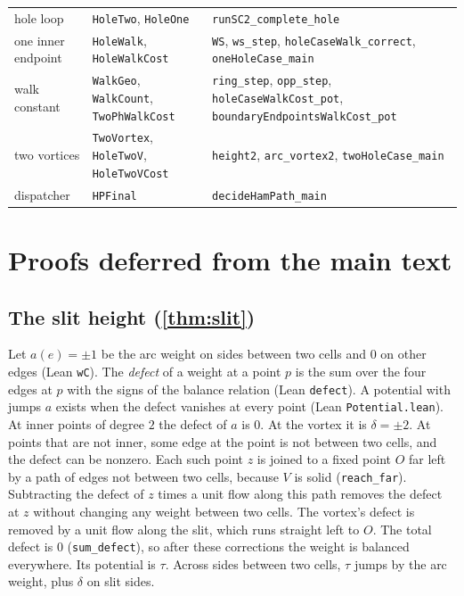 \documentclass[11pt]{article}
\theoremstyle{plain}
\theoremstyle{definition}
\theoremstyle{remark}
\newcommand{\lean}[1]{\texttt{#1}}
\begin{document}
\begin{center}
\begin{tabular}{@{}p{}p{}p{}@{}}
hole loop & \lean{HoleTwo}, \lean{HoleOne} & \lean{runSC2\_complete\_hole}\\
one inner endpoint & \lean{HoleWalk}, \lean{HoleWalkCost} & \lean{WS}, \lean{ws\_step}, \lean{holeCaseWalk\_correct}, \lean{oneHoleCase\_main}\\
walk constant & \lean{WalkGeo}, \lean{WalkCount}, \lean{TwoPhWalkCost} & \lean{ring\_step}, \lean{opp\_step}, \lean{holeCaseWalkCost\_pot}, \lean{boundaryEndpointsWalkCost\_pot}\\
two vortices & \lean{TwoVortex}, \lean{HoleTwoV}, \lean{HoleTwoVCost} & \lean{height2}, \lean{arc\_vortex2}, \lean{twoHoleCase\_main}\\
dispatcher & \lean{HPFinal} & \lean{decideHamPath\_main}\\
\bottomrule
\end{tabular}
\end{center}

\section{Proofs deferred from the main text}
\label{app:proofs}

\subsection{The slit height (\cref{thm:slit})}
\label{app:slit}

Let $a(e)=\pm1$ be the arc weight on sides between two cells and $0$ on other edges
(Lean \lean{wC}).
The \emph{defect} of a weight at a point $p$ is the sum over the four edges at $p$ with the signs
of the balance relation (Lean \lean{defect}).
A potential with jumps $a$ exists when the defect vanishes at every point (Lean
\lean{Potential.lean}).
At inner points of degree $2$ the defect of $a$ is $0$.
At the vortex it is $\delta=\pm2$.
At points that are not inner, some edge at the point is not between two cells, and the defect can be
nonzero.
Each such point $z$ is joined to a fixed point $O$ far left by a path of edges not between two
cells, because $V$ is solid (\lean{reach\_far}).
Subtracting the defect of $z$ times a unit flow along this path removes the defect at $z$ without
changing any weight between two cells.
The vortex's defect is removed by a unit flow along the slit, which runs straight left to $O$.
The total defect is $0$ (\lean{sum\_defect}), so after these corrections the weight is balanced
everywhere.
Its potential is $\tau$.
Across sides between two cells, $\tau$ jumps by the arc weight, plus $\delta$ on slit sides.
\end{document}
